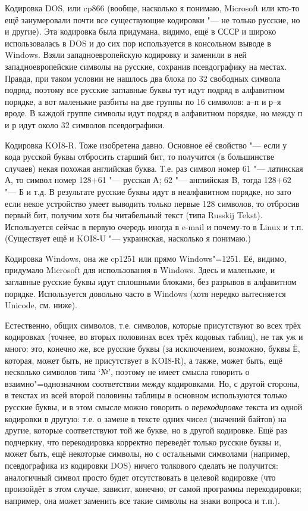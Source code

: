 \begin{ulist}                         
\item Кодировка DOS, или cp866 (вообще, насколько я понимаю, Microsoft или кто-то ещё занумеровали почти все существующие
кодировки "--- не только русские, но и другие). Эта кодировка была придумана, видимо, ещё в СССР и широко использовалась в 
DOS и до сих пор используется в консольном выводе в Windows. Взяли западноевропейскую кодировку и заменили в ней 
западноевропейские символы на русские, сохранив псевдографику на местах. Правда, при таком условии не нашлось два блока
по 32 свободных символа подряд, поэтому все русские заглавные буквы тут идут подряд в алфавитном порядке, а вот маленькие
разбиты на две группы по 16 символов: а--п и р--я вроде. В каждой группе символы идут подряд в алфавитном порядке,
но между п и р идут около 32 символов псевдографики.
\item Кодировка KOI8-R. Тоже изобретена давно. Основное её свойство "--- если у кода русской буквы отбросить старший бит,
то получится (в большинстве случаев) некая похожая английская буква. Т.е. раз символ номер 61 "--- латинская А, то символ номер 
128+61 "--- русская А; 62 "--- английская B, тогда 128+62 "--- Б и т.д. В результате русские буквы идут в неалфавитном порядке,
но зато если некое устройство умеет выводить только первые 128 символов, то отбросив первый бит, получим хотя
бы читабельный текст (типа Russkij Tekst). Используется сейчас в первую очередь иногда в 
e-mail и почему-то в Linux и т.п. (Существует ещё и KOI8-U "--- украинская, насколько я понимаю.)
\item Кодировка Windows, она же cp1251 или прямо Windows"=1251. Её, видимо, придумало Microsoft для использования
в Windows. Здесь и маленькие, и заглавные русские буквы идут сплошными блоками, без разрывов в 
алфавитном порядке. Используется довольно часто в Windows (хотя нередко вытесняется Unicode, 
см. ниже).
\end{ulist}

Естественно, общих символов, т.е. символов, которые присутствуют во всех трёх кодировках (точнее, во 
вторых половинах всех трёх кодовых таблиц), не 
так уж и много: это, конечно же, все русские буквы (за исключением, возможно, буквы Ё, 
которая, может быть, не присутствует в KOI8-R), а также, может быть, ещё несколько символов 
типа `№', поэтому не имеет смысла говорить о взаимно"=однозначном соответствии между 
кодировками. Но, с другой стороны, в текстах из всей второй половины таблицы в основном используются 
только русские буквы, и в этом смысле можно говорить о \textit{перекодировке} текста из одной 
кодировки в другую: т.е. о замене в тексте одних чисел (значений байтов) на другие, которые 
соответствуют той же букве, но в другой кодировке. Ещё раз подчеркну, что перекодировка корректно 
переведёт только русские буквы и, может быть, ещё некоторые символы, но с остальными символами
(например, псевдографика из кодировки DOS) ничего толкового сделать не получится: аналогичный 
символ просто будет отсутствовать в целевой  кодировке (что произойдёт в этом случае, зависит, конечно, 
от самой программы перекодировки; например, она может заменить все такие символы на знаки 
вопроса и т.п.).

